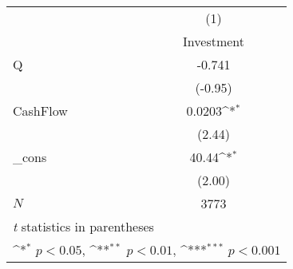 {
\def\sym#1{\ifmmode^{#1}\else\(^{#1}\)\fi}
\begin{tabular}{l*{1}{c}}
\hline\hline
            &\multicolumn{1}{c}{(1)}\\
            &\multicolumn{1}{c}{Investment}\\
\hline
Q           &      -0.741         \\
            &     (-0.95)         \\
[1em]
CashFlow    &      0.0203\sym{*}  \\
            &      (2.44)         \\
[1em]
\_cons      &       40.44\sym{*}  \\
            &      (2.00)         \\
\hline
\(N\)       &        3773         \\
\hline\hline
\multicolumn{2}{l}{\footnotesize \textit{t} statistics in parentheses}\\
\multicolumn{2}{l}{\footnotesize \sym{*} \(p<0.05\), \sym{**} \(p<0.01\), \sym{***} \(p<0.001\)}\\
\end{tabular}
}
